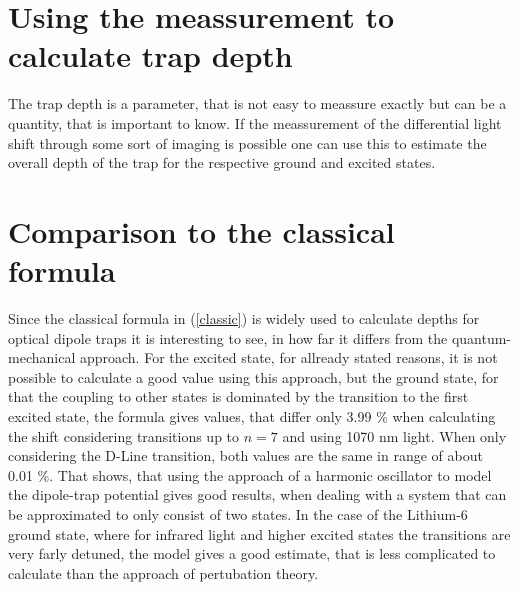 \section{Using the meassurement to calculate trap depth}

The trap depth is a parameter, that is not easy to meassure exactly but can be a quantity, that is important to know. If the meassurement of the differential light shift through some sort of imaging is possible one can use this to estimate the overall depth of the trap for the respective ground and excited states.

\section{Comparison to the classical formula}

Since the classical formula in (\ref{classic}) is widely used to calculate depths for optical dipole traps it is interesting to see, in how far it differs from the quantum-mechanical approach. For the excited state, for allready stated reasons, it is not possible to calculate a good value using this approach, but the ground state, for that the coupling to other states is dominated by the transition to the first excited state, the formula gives values, that differ only 3.99 \% when calculating the shift considering transitions up to $n=7$ and using 1070 nm light. When only considering the D-Line transition, both values are the same in range of about 0.01 \%. That shows, that using the approach of a harmonic oscillator to model the dipole-trap potential gives good results, when dealing with a system that can be approximated to only consist of two states. In the case of the Lithium-6 ground state, where for infrared light and higher excited states the transitions are very farly detuned, the model gives a good estimate, that is less complicated to calculate than the approach of pertubation theory.